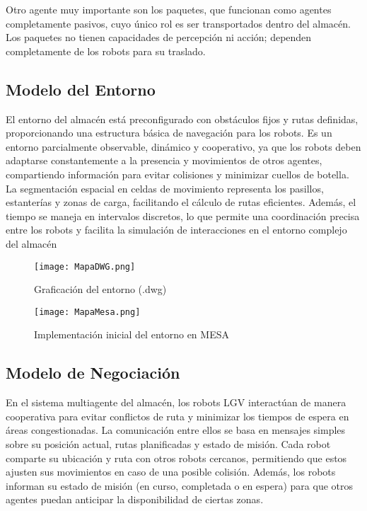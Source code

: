 \documentclass[sjournal]{IEEEtran}
\begin{document}
Otro agente muy importante son los paquetes, que funcionan como agentes completamente pasivos, cuyo único rol es ser transportados dentro del almacén. Los paquetes no tienen capacidades de percepción ni acción; dependen completamente de los robots para su traslado.

\subsection{Modelo del Entorno}
El entorno del almacén está preconfigurado con obstáculos fijos y rutas definidas, proporcionando una estructura básica de navegación para los robots. Es un entorno parcialmente observable, dinámico y cooperativo, ya que los robots deben adaptarse constantemente a la presencia y movimientos de otros agentes, compartiendo información para evitar colisiones y minimizar cuellos de botella. La segmentación espacial en celdas de movimiento representa los pasillos, estanterías y zonas de carga, facilitando el cálculo de rutas eficientes. Además, el tiempo se maneja en intervalos discretos, lo que permite una coordinación precisa entre los robots y facilita la simulación de interacciones en el entorno complejo del almacén
\begin{figure}
    \centering
    \texttt{[image: MapaDWG.png]}
    \caption{Graficación del entorno (.dwg)}
    \label{fig:enter-label}
\end{figure}
\begin{figure}
    \centering
    \texttt{[image: MapaMesa.png]}
    \caption{Implementación inicial del entorno en MESA}
    \label{fig:enter-label}
\end{figure}


\subsection{Modelo de Negociación}
En el sistema multiagente del almacén, los robots LGV interactúan de manera cooperativa para evitar conflictos de ruta y minimizar los tiempos de espera en áreas congestionadas. La comunicación entre ellos se basa en mensajes simples sobre su posición actual, rutas planificadas y estado de misión. Cada robot comparte su ubicación y ruta con otros robots cercanos, permitiendo que estos ajusten sus movimientos en caso de una posible colisión. Además, los robots informan su estado de misión (en curso, completada o en espera) para que otros agentes puedan anticipar la disponibilidad de ciertas zonas.
\end{document}
